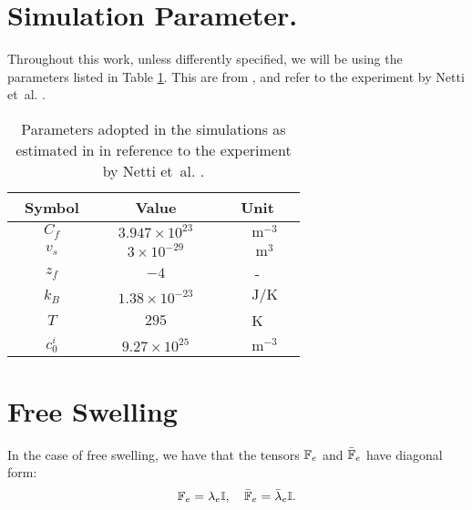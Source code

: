 \section{Simulation Parameter.}
\label{para}
Throughout this work, unless differently specified, we will be using the parameters listed in Table \ref{Tab1}. This are from \cite{ecm2}, and refer to the experiment by Netti et~al. \cite{Netti,ecm2}.
\begin{table}[h!]
	\vspace{4mm}
	\centering
	\begin{tabular}{|c| c| c|}
		\hline\addlinespace[2pt]
		Symbol  & Value& Unit\\
		\hline\addlinespace[3pt]
		$\qquad C_f\qquad$  & $\quad3.947\times 10^{23}\quad$& $\qquad\text{m}^{-3}\quad$\\
		$\qquad v_s\qquad$  & $\quad3\times 10^{-29}\quad$& $\qquad\text{m}^3\quad$ \\
		$\qquad z_f\qquad$ & $-4$& -\\
		$\qquad k_B\qquad$ & $1.38 \times 10^{-23}$& $\qquad\text{J}/\text{K}\quad$\\
		$\qquad T\qquad$ &$295$ &K\\
		$\qquad c^i_0\qquad$ & $9.27\times 10^{25}$& $\qquad\text{m}^{-3}\quad$\\
		\hline
	\end{tabular}
	\vspace{4mm}
	\caption{Parameters adopted in the simulations as estimated in \cite{ecm2} in reference to the experiment by Netti et~al. \cite{Netti}.}
	\label{Tab1}
\end{table}

\section{Free Swelling}
\label{apfree}
In the case of free swelling, we have that the tensors $\mathbb{F}_e$ and $\bar{\mathbb{F}}_e$ have diagonal form: 
\begin{equation}
\mathbb{F}_e=\lambda_e \mathbb{I},\quad \bar{\mathbb{F}}_e=\bar{\lambda}_e \mathbb{I}.
\end{equation}

